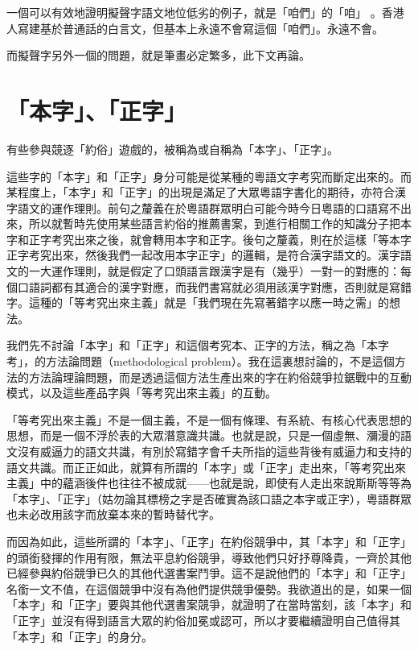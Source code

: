 \documentclass[a5paper, 12pt, openany]{book} %
\begin{document}
一個可以有效地證明擬聲字語文地位低劣的例子，就是「咱們」的「咱」 。香港人寫建基於普通話的白言文，但基本上永遠不會寫這個「咱們」。永遠不會。

而擬聲字另外一個的問題，就是筆畫必定繁多，此下文再論。

\section{「本字」、「正字」}

有些參與競逐「約俗」遊戲的，被稱為或自稱為「本字」、「正字」。

這些字的「本字」和「正字」身分可能是從某種的粵語文字考究而斷定出來的。而某程度上，「本字」和「正字」的出現是滿足了大眾粵語字書化的期待，亦符合漢字語文的運作理則。前句之釐義在於粵語群眾明白可能今時今日粵語的口語寫不出來，所以就暫時先使用某些語言約俗的推薦書案，到進行相關工作的知識分子把本字和正字考究出來之後，就會轉用本字和正字。後句之釐義，則在於這樣「等本字正字考究出來，然後我們一起改用本字正字」的邏輯，是符合漢字語文的。漢字語文的一大運作理則，就是假定了口頭語言跟漢字是有（幾乎）一對一的對應的：每個口語詞都有其適合的漢字對應，而我們書寫就必須用該漢字對應，否則就是寫錯字。這種的「等考究出來主義」就是「我們現在先寫著錯字以應一時之需」的想法。

我們先不討論「本字」和「正字」和這個考究本、正字的方法，稱之為「本字考」，的方法論問題（methodological problem）。我在這裏想討論的，不是這個方法的方法論理論問題，而是透過這個方法生產出來的字在約俗競爭拉鋸戰中的互動模式，以及這些產品字與「等考究出來主義」的互動。

「等考究出來主義」不是一個主義，不是一個有條理、有系統、有核心代表思想的思想，而是一個不浮於表的大眾潛意識共識。也就是說，只是一個虛無、瀰漫的語文沒有威逼力的語文共識，有別於寫錯字會千夫所指的這些背後有威逼力和支持的語文共識。而正正如此，就算有所謂的「本字」或「正字」走出來，「等考究出來主義」中的蘊涵後件也往往不被成就——也就是說，即使有人走出來說斯斯等等為「本字」、「正字」（姑勿論其標榜之字是否確實為該口語之本字或正字），粵語群眾也未必改用該字而放棄本來的暫時替代字。

而因為如此，這些所謂的「本字」、「正字」在約俗競爭中，其「本字」和「正字」的頭銜發揮的作用有限，無法平息約俗競爭，導致他們只好抒尊降貴，一齊於其他已經參與約俗競爭已久的其他代選書案鬥爭。這不是說他們的「本字」和「正字」名銜一文不值，在這個競爭中沒有為他們提供競爭優勢。我欲道出的是，如果一個「本字」和「正字」要與其他代選書案競爭，就證明了在當時當刻，該「本字」和「正字」並沒有得到語言大眾的約俗加冕或認可，所以才要繼續證明自己值得其「本字」和「正字」的身分。
\end{document}
